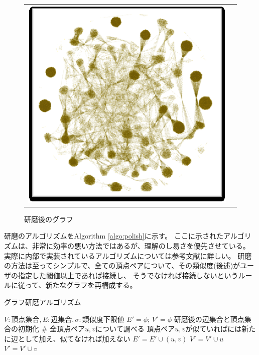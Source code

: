\begin{figure}[htbp]
\begin{center}
\begin{tabular}{cc}
\begin{minipage}{0.3\hsize}
\begin{center}
\includegraphics[scale=0.5]{./polish1.eps}
\caption{研磨後のグラフ\label{fig:polish1}}
\end{center}
\end{minipage}

\end{tabular} 
\end{center}
\end{figure} 

研磨のアルゴリズムをAlgorithm \ref{algo:polish}に示す。
ここに示されたアルゴリズムは、非常に効率の悪い方法ではあるが、理解のし易さを優先させている。
実際に内部で実装されているアルゴリズムについては参考文献\cite{Uno2014}に詳しい。
研磨の方法は至ってシンプルで、全ての頂点ペアについて、その類似度(後述)がユーザの指定した閾値以上であれば接続し、
そうでなければ接続しないというルールに従って、新たなグラフを再構成する。


\begin{algorithm}
\caption{グラフ研磨アルゴリズム\label{algo:polish}}
\begin{small}
\begin{algorithmic}[1]
	\State $V:頂点集合, E:辺集合, \sigma: 類似度下限値$
	\State $E'=\phi$; $V'=\phi$ \Comment 研磨後の辺集合と頂点集合の初期化
		 \Comment \# 全頂点ペア$u,v$について調べる
			 \Comment 頂点ペア$u,v$が似ていればには新たに辺として加え、似てなければ加えない
				\State $E'=E'\cup (u,v)$
				\State $V'=V'\cup u$
				\State $V'=V'\cup v$
			\EndIf
		\EndFor
	\EndFor
\EndFunction
\end{algorithmic}
\end{small}
\end{algorithm}

